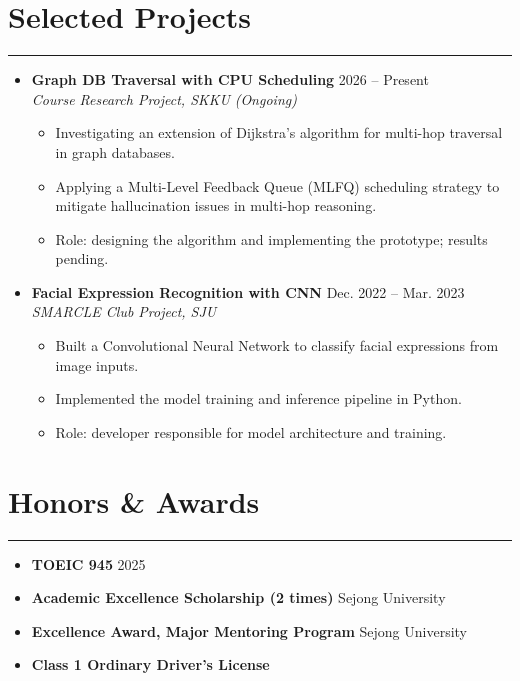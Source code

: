 \documentclass[letterpaper, 10pt]{article}
\begin{document}
\section*{Selected Projects}
\hrule
\vspace{4pt}
\begin{itemize}
    \item[]
    \textbf{Graph DB Traversal with CPU Scheduling} \hfill 2026 -- Present \\
    \textit{Course Research Project, SKKU} \hfill \textit{(Ongoing)}
    \begin{itemize}
        \item Investigating an extension of Dijkstra's algorithm for multi-hop traversal in graph databases.
        \item Applying a Multi-Level Feedback Queue (MLFQ) scheduling strategy to mitigate hallucination issues in multi-hop reasoning.
        \item Role: designing the algorithm and implementing the prototype; results pending.
    \end{itemize}
    \item[]
    \textbf{Facial Expression Recognition with CNN} \hfill Dec. 2022 -- Mar. 2023 \\
    \textit{SMARCLE Club Project, SJU}
    \begin{itemize}
        \item Built a Convolutional Neural Network to classify facial expressions from image inputs.
        \item Implemented the model training and inference pipeline in Python.
        \item Role: developer responsible for model architecture and training.
    \end{itemize}
\end{itemize}
\section*{Honors \& Awards}
\hrule
\vspace{4pt}
\begin{itemize}
    \item \textbf{TOEIC 945} \hfill 2025
    \item \textbf{Academic Excellence Scholarship (2 times)} \hfill Sejong University
    \item \textbf{Excellence Award, Major Mentoring Program} \hfill Sejong University
    \item \textbf{Class 1 Ordinary Driver's License}
\end{itemize}
\end{document}
